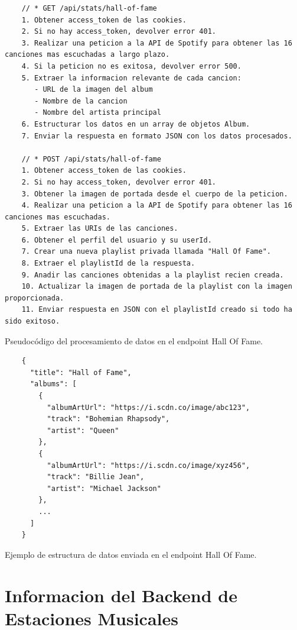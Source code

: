 \begin{ifalgorithm}[H]
    \begin{lstlisting}
    // * GET /api/stats/hall-of-fame
    1. Obtener access_token de las cookies.
    2. Si no hay access_token, devolver error 401.
    3. Realizar una peticion a la API de Spotify para obtener las 16 canciones mas escuchadas a largo plazo.
    4. Si la peticion no es exitosa, devolver error 500.
    5. Extraer la informacion relevante de cada cancion:
       - URL de la imagen del album
       - Nombre de la cancion
       - Nombre del artista principal
    6. Estructurar los datos en un array de objetos Album.
    7. Enviar la respuesta en formato JSON con los datos procesados.

    // * POST /api/stats/hall-of-fame
    1. Obtener access_token de las cookies.
    2. Si no hay access_token, devolver error 401.
    3. Obtener la imagen de portada desde el cuerpo de la peticion.
    4. Realizar una peticion a la API de Spotify para obtener las 16 canciones mas escuchadas.
    5. Extraer las URIs de las canciones.
    6. Obtener el perfil del usuario y su userId.
    7. Crear una nueva playlist privada llamada "Hall Of Fame".
    8. Extraer el playlistId de la respuesta.
    9. Anadir las canciones obtenidas a la playlist recien creada.
    10. Actualizar la imagen de portada de la playlist con la imagen proporcionada.
    11. Enviar respuesta en JSON con el playlistId creado si todo ha sido exitoso.
    \end{lstlisting}
    \caption{Pseudocódigo del procesamiento de datos en el endpoint Hall Of Fame.}
    \label{alg:hall_of_fame}
\end{ifalgorithm}

\begin{ifalgorithm}[H]
    \begin{lstlisting}
    {
      "title": "Hall of Fame",
      "albums": [
        {
          "albumArtUrl": "https://i.scdn.co/image/abc123",
          "track": "Bohemian Rhapsody",
          "artist": "Queen"
        },
        {
          "albumArtUrl": "https://i.scdn.co/image/xyz456",
          "track": "Billie Jean",
          "artist": "Michael Jackson"
        },
        ...
      ]
    }
    \end{lstlisting}
    \caption{Ejemplo de estructura de datos enviada en el endpoint Hall Of Fame.}
    \label{alg:hall_of_fame_response}
\end{ifalgorithm}

\section{Informacion del Backend de Estaciones Musicales} \label{sec:backend_estaciones_musicales}

